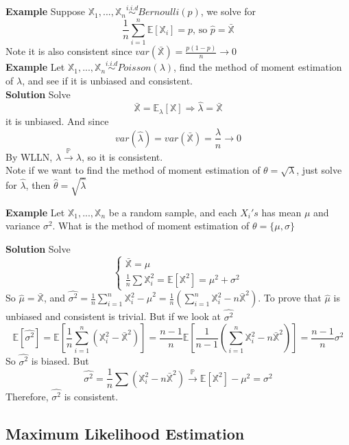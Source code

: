 \textbf{Example} Suppose $\mathbb{X}_1, ..., \mathbb{X}_n \overset{i.i.d}{\sim} Bernoulli(p)$, we solve for
$$\frac{1}{n}\sum_{i=1}^n\mathbb{E}[ \mathbb{X}_i] = p \text{, so } \hat{p} = \bar{\mathbb{X}}$$
Note it is also consistent since $var(\bar{\mathbb{X}}) = \frac{p(1-p)}{n}\to 0$\\

\textbf{Example} Let $\mathbb{X}_1, ..., \mathbb{X}_n \overset{i.i.d}{\sim} Poisson(\lambda)$, find the method of moment estimation of $\lambda$, and see if it is unbiased and consistent.\\

\textbf{Solution} Solve
$$\bar{\mathbb{X}} = \mathbb{E}_\lambda[\mathbb{X}] \Rightarrow \hat{\lambda} = \bar{\mathbb{X}}$$
it is unbiased. And since
$$var(\hat{\lambda}) = var( \bar{\mathbb{X}} ) = \frac{\lambda}{n} \to 0$$ By WLLN, $\hat{\lambda} \overset{\mathbb{P}}{\to} \lambda$, so it is consistent.\\

Note if we want to find the method of moment estimation of $\theta = \sqrt{\lambda}$, just solve for $\hat{\lambda}$, then $\hat{\theta} = \sqrt{
\hat{\lambda}}$

\textbf{Example} Let $\mathbb{X}_1, ..., \mathbb{X}_n$ be a random sample, and each $X_i's$ has mean $\mu$ and variance $\sigma^2$. What is the method of moment estimation of $\theta = \{\mu, \sigma\}$

\textbf{Solution} Solve
$$\begin{cases}
\bar{\mathbb{X}} = \mu \\
\frac{1}{n}\sum \mathbb{X}_i^2 = \mathbb{E}[\mathbb{X}^2] = \mu^2 + \sigma^2
\end{cases}$$
So $\hat{\mu} = \bar{\mathbb{X}}$, and $\hat{\sigma^2} = \frac{1}{n}\sum_{i=1}^n \mathbb{X}_i^2 - \hat{\mu}^2 = \frac{1}{n} (\sum_{i=1}^n \mathbb{X}_i^2 - n\bar{\mathbb{X}}^2)$. To prove that $\hat{\mu}$ is unbiased and consistent is trivial. But if we look at $\hat{\sigma^2}$ 
$$\mathbb{E}[\hat{\sigma^2}] = \mathbb{E}[ \frac{1}{n} \sum_{i=1}^n (\mathbb{X}_i^2 - \bar{\mathbb{X}}^2) ] = \frac{n-1}{n}\mathbb{E}[ \frac{1}{n-1} (\sum_{i=1}^n \mathbb{X}_i^2 - n\bar{\mathbb{X}}^2) ] = \frac{n-1}{n} \sigma^2$$
So $\hat{\sigma^2}$ is biased. But
$$\hat{\sigma^2} = \frac{1}{n} \sum (\mathbb{X}_i^2 - n\bar{\mathbb{X}}^2) \overset{\mathbb{P}}{\to} \mathbb{E}[\mathbb{X}^2] - \mu^2 = \sigma^2$$ Therefore, $\hat{\sigma^2}$ is consistent.

\subsection{Maximum Likelihood Estimation}

